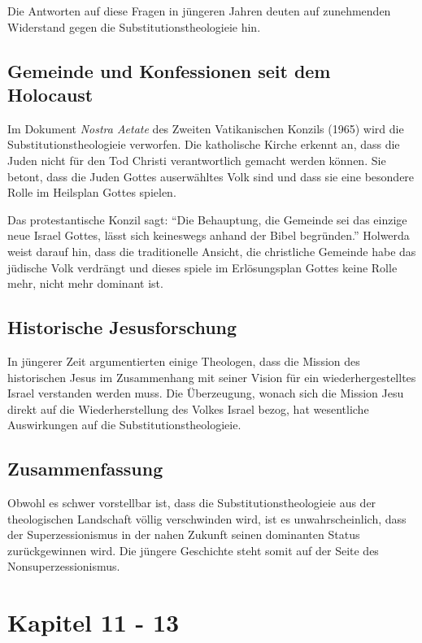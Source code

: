 \documentclass[fontsize=14pt]{../../inc/mybib}
\newcommand{\sz}{Superzessionismus}
\newcommand{\sts}{Substitutionstheologie}
\begin{document}
    Die Antworten auf diese Fragen in jüngeren Jahren deuten auf zunehmenden Widerstand gegen die \sts ie hin.

    \subsection{Gemeinde und Konfessionen seit dem Holocaust}
    Im Dokument \textit{Nostra Aetate} des Zweiten Vatikanischen Konzils (1965) wird die \sts ie verworfen. Die katholische Kirche erkennt an, dass die Juden nicht für den Tod Christi verantwortlich gemacht werden können. Sie betont, dass die Juden Gottes auserwähltes Volk sind und dass sie eine besondere Rolle im Heilsplan Gottes spielen.

    Das protestantische Konzil sagt: \enquote{Die Behauptung, die Gemeinde sei das einzige neue Israel Gottes, lässt sich keineswegs anhand der Bibel begründen.} 
    Holwerda weist darauf hin, dass die traditionelle Ansicht, die christliche Gemeinde habe das jüdische Volk verdrängt und dieses spiele im Erlösungsplan Gottes keine Rolle mehr, nicht mehr dominant ist.

    \subsection{Historische Jesusforschung}
    In jüngerer Zeit argumentierten einige Theologen, dass die Mission des historischen Jesus im Zusammenhang mit seiner Vision für ein wiederhergestelltes Israel verstanden werden muss. Die Überzeugung, wonach sich die Mission Jesu direkt auf die Wiederherstellung des Volkes Israel bezog, hat wesentliche Auswirkungen auf die \sts ie.

    \subsection{Zusammenfassung}
    Obwohl es schwer vorstellbar ist, dass die \sts ie aus der theologischen Landschaft völlig verschwinden wird, ist es unwahrscheinlich, dass der \sz{} in der nahen Zukunft seinen dominanten Status zurückgewinnen wird. Die jüngere Geschichte steht somit auf der Seite des Nonsuperzessionismus.

    \section{Kapitel 11 - 13}
\end{document}
